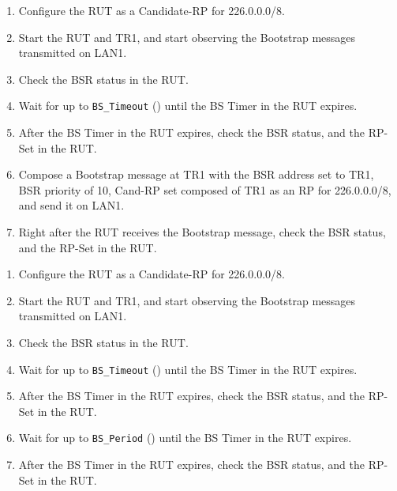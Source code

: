 \documentclass[11pt]{report}
\begin{document}
\begin{enumerate}

  \item Configure the RUT as a Candidate-RP for 226.0.0.0/8.

  \item Start the RUT and TR1, and start observing the Bootstrap messages
  transmitted on LAN1.

  \item Check the BSR status in the RUT.

  \item Wait for up to \verb=BS_Timeout= ({\PimsmBSTimeout}) until the BS
  Timer in the RUT expires.

  \item After the BS Timer in the RUT expires, check the BSR status, and the
  RP-Set in the RUT.

  \item Compose a Bootstrap message at TR1 with the BSR address set to TR1,
  BSR priority of 10, Cand-RP set composed of TR1 as an RP for 226.0.0.0/8,
  and send it on LAN1.

  \item Right after the RUT receives the Bootstrap message, check the BSR
  status, and the RP-Set in the RUT.

\end{enumerate}


\begin{enumerate}

  \item Configure the RUT as a Candidate-RP for 226.0.0.0/8.

  \item Start the RUT and TR1, and start observing the Bootstrap messages
  transmitted on LAN1.

  \item Check the BSR status in the RUT.

  \item Wait for up to \verb=BS_Timeout= ({\PimsmBSTimeout}) until the BS
  Timer in the RUT expires.

  \item After the BS Timer in the RUT expires, check the BSR status, and the
  RP-Set in the RUT.

  \item Wait for up to \verb=BS_Period= ({\PimsmBSPeriod}) until the BS
  Timer in the RUT expires.

  \item After the BS Timer in the RUT expires, check the BSR status, and the
  RP-Set in the RUT.

\end{enumerate}
\end{document}
